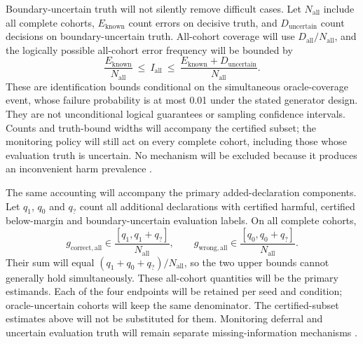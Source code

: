 Boundary-uncertain truth will not silently remove difficult cases. Let $N_{\mathrm{all}}$ include all complete cohorts, $E_{\mathrm{known}}$ count errors on decisive truth, and $D_{\mathrm{uncertain}}$ count decisions on boundary-uncertain truth. All-cohort coverage will use $D_{\mathrm{all}}/N_{\mathrm{all}}$, and the logically possible all-cohort error frequency will be bounded by
\begin{equation}
\frac{E_{\mathrm{known}}}{N_{\mathrm{all}}}\ \leq\ I_{\mathrm{all}}\ \leq\
\frac{E_{\mathrm{known}}+D_{\mathrm{uncertain}}}{N_{\mathrm{all}}}.
\end{equation}
These are identification bounds conditional on the simultaneous oracle-coverage event, whose failure probability is at most 0.01 under the stated generator design. They are not unconditional logical guarantees or sampling confidence intervals. Counts and truth-bound widths will accompany the certified subset; the monitoring policy will still act on every complete cohort, including those whose evaluation truth is uncertain. No mechanism will be excluded because it produces an inconvenient harm prevalence \cite{hoeffding,selective}.

The same accounting will accompany the primary added-declaration components. Let $q_1$, $q_0$ and $q_?$ count all additional declarations with certified harmful, certified below-margin and boundary-uncertain evaluation labels. On all complete cohorts,
\begin{equation}
g_{\mathrm{correct,all}}\in\frac{[q_1,q_1+q_?]}{N_{\mathrm{all}}},\qquad
g_{\mathrm{wrong,all}}\in\frac{[q_0,q_0+q_?]}{N_{\mathrm{all}}}.
\end{equation}
Their sum will equal $(q_1+q_0+q_?)/N_{\mathrm{all}}$, so the two upper bounds cannot generally hold simultaneously. These all-cohort quantities will be the primary estimands. Each of the four endpoints will be retained per seed and condition; oracle-uncertain cohorts will keep the same denominator. The certified-subset estimates above will not be substituted for them. Monitoring deferral and uncertain evaluation truth will remain separate missing-information mechanisms \cite{hoeffding}.

